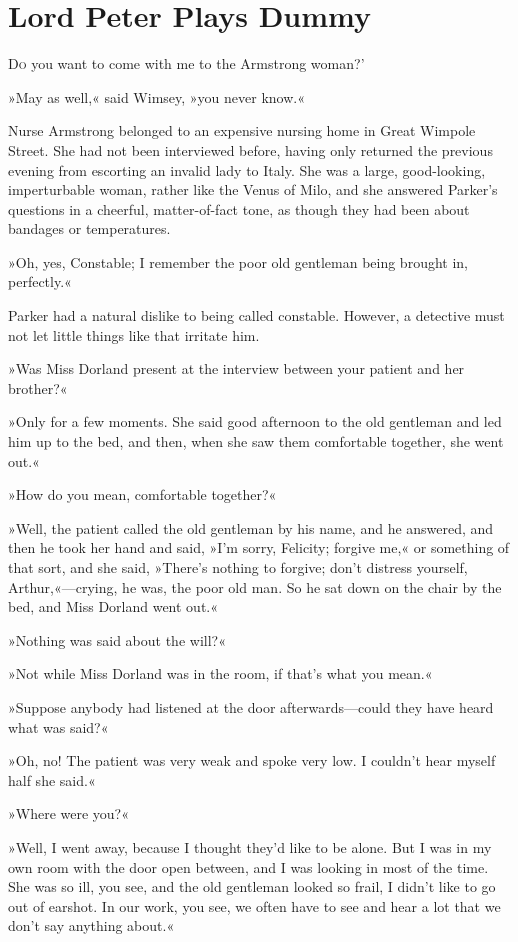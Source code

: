 \chapter{Lord Peter Plays Dummy}
\lettrine[lines=4,ante=‘]{D}{o} you want to come with me to the Armstrong woman?'

\zz
»May as well,« said Wimsey, »you never know.«

\zz
Nurse Armstrong belonged to an expensive nursing home in Great Wimpole Street. She had not been interviewed before, having only returned the previous evening from escorting an invalid lady to Italy. She was a large, good-looking, imperturbable woman, rather like the Venus of Milo, and she answered Parker's questions in a cheerful, matter-of-fact tone, as though they had been about bandages or temperatures.

»Oh, yes, Constable; I remember the poor old gentleman being brought in, perfectly.«

Parker had a natural dislike to being called constable. However, a detective must not let little things like that irritate him.

»Was Miss Dorland present at the interview between your patient and her brother?«

»Only for a few moments. She said good afternoon to the old gentleman and led him up to the bed, and then, when she saw them comfortable together, she went out.«

»How do you mean, comfortable together?«

»Well, the patient called the old gentleman by his name, and he answered, and then he took her hand and said, »I'm sorry, Felicity; forgive me,« or something of that sort, and she said, »There's nothing to forgive; don't distress yourself, Arthur,«—crying, he was, the poor old man. So he sat down on the chair by the bed, and Miss Dorland went out.«

»Nothing was said about the will?«

»Not while Miss Dorland was in the room, if that's what you mean.«

»Suppose anybody had listened at the door afterwards—could they have heard what was said?«

»Oh, no! The patient was very weak and spoke very low. I couldn't hear myself half she said.«

»Where were you?«

»Well, I went away, because I thought they'd like to be alone. But I was in my own room with the door open between, and I was looking in most of the time. She was so ill, you see, and the old gentleman looked so frail, I didn't like to go out of earshot. In our work, you see, we often have to see and hear a lot that we don't say anything about.«

